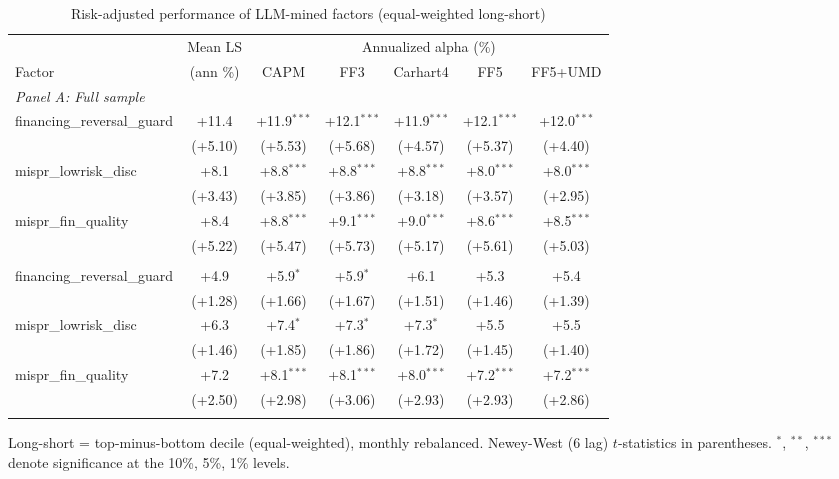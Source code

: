 \begin{table}[htbp]\centering
\caption{Risk-adjusted performance of LLM-mined factors (equal-weighted long-short)}
\label{tab:alphas_ew}
\begin{threeparttable}\footnotesize
\begin{tabular}{lcccccc}
\toprule
 & Mean LS & \multicolumn{5}{c}{Annualized alpha (\%)} \\
\cmidrule(lr){3-7}
Factor & (ann \%) & CAPM & FF3 & Carhart4 & FF5 & FF5+UMD \\
\midrule
\multicolumn{7}{l}{\textit{Panel A: Full sample}} \\
\addlinespace
financing\_reversal\_guard & +11.4 & +11.9$^{***}$ & +12.1$^{***}$ & +11.9$^{***}$ & +12.1$^{***}$ & +12.0$^{***}$ \\
 & (+5.10) & (+5.53) & (+5.68) & (+4.57) & (+5.37) & (+4.40) \\
\addlinespace
mispr\_lowrisk\_disc & +8.1 & +8.8$^{***}$ & +8.8$^{***}$ & +8.8$^{***}$ & +8.0$^{***}$ & +8.0$^{***}$ \\
 & (+3.43) & (+3.85) & (+3.86) & (+3.18) & (+3.57) & (+2.95) \\
\addlinespace
mispr\_fin\_quality & +8.4 & +8.8$^{***}$ & +9.1$^{***}$ & +9.0$^{***}$ & +8.6$^{***}$ & +8.5$^{***}$ \\
 & (+5.22) & (+5.47) & (+5.73) & (+5.17) & (+5.61) & (+5.03) \\
\addlinespace
\midrule
\multicolumn{7}{l}{\textit{Panel B: Out-of-sample (post-2000-12-31)}} \\
\addlinespace
financing\_reversal\_guard & +4.9 & +5.9$^{*}$ & +5.9$^{*}$ & +6.1 & +5.3 & +5.4 \\
 & (+1.28) & (+1.66) & (+1.67) & (+1.51) & (+1.46) & (+1.39) \\
\addlinespace
mispr\_lowrisk\_disc & +6.3 & +7.4$^{*}$ & +7.3$^{*}$ & +7.3$^{*}$ & +5.5 & +5.5 \\
 & (+1.46) & (+1.85) & (+1.86) & (+1.72) & (+1.45) & (+1.40) \\
\addlinespace
mispr\_fin\_quality & +7.2 & +8.1$^{***}$ & +8.1$^{***}$ & +8.0$^{***}$ & +7.2$^{***}$ & +7.2$^{***}$ \\
 & (+2.50) & (+2.98) & (+3.06) & (+2.93) & (+2.93) & (+2.86) \\
\addlinespace
\bottomrule
\end{tabular}
\begin{tablenotes}\footnotesize
\item Long-short = top-minus-bottom decile (equal-weighted), monthly rebalanced. Newey-West (6 lag) $t$-statistics in parentheses. $^{*}$, $^{**}$, $^{***}$ denote significance at the 10\%, 5\%, 1\% levels.
\end{tablenotes}
\end{threeparttable}
\end{table}